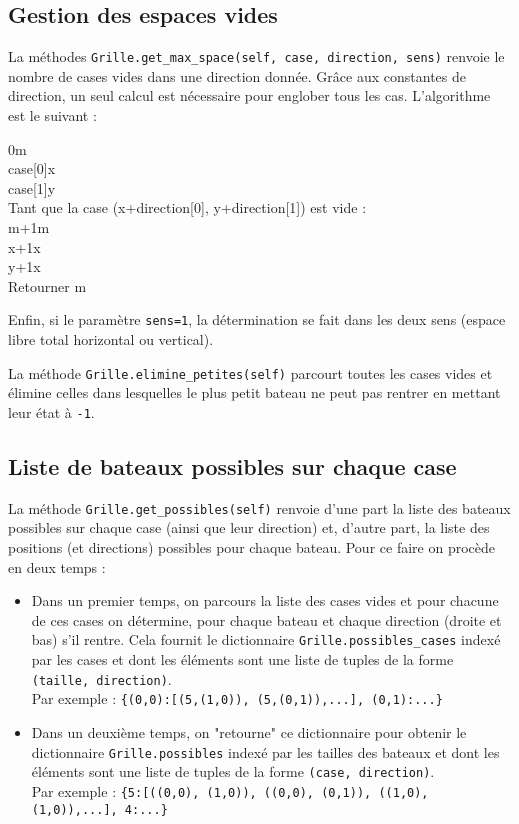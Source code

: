\subsection{Gestion des espaces vides}
La méthodes \texttt{Grille.get\_max\_space(self, case, direction, sens)} renvoie le nombre de cases vides dans une direction donnée. Grâce aux constantes de direction, un seul calcul est nécessaire pour englober tous les cas. L'algorithme est le suivant :
\begin{algo1}
0\sto m\\
case[0]\sto x\\
case[1]\sto y\\
Tant que la case (x+direction[0], y+direction[1]) est vide :\\
 m+1\sto m\\
 x+1\sto x\\
 y+1\sto x\\
Retourner m\\
\end{algo1}

Enfin, si le paramètre \texttt{sens=1}, la détermination se fait dans les deux sens (espace libre total horizontal ou vertical).

La méthode \texttt{Grille.elimine\_petites(self)} parcourt toutes les cases vides et élimine celles dans lesquelles le plus petit bateau ne peut pas rentrer en mettant leur état à \texttt{-1}.

\subsection{Liste de bateaux possibles sur chaque case}
La méthode \texttt{Grille.get\_possibles(self)} renvoie d'une part la liste des bateaux possibles sur chaque case (ainsi que leur direction) et, d'autre part, la liste des positions (et directions) possibles pour chaque bateau. Pour ce faire on procède en deux temps :
\begin{itemize}
\item Dans un premier temps, on parcours la liste des cases vides et pour chacune de ces cases on détermine, pour chaque bateau et chaque direction (droite et bas) s'il rentre. Cela fournit le dictionnaire \texttt{Grille.possibles\_cases} indexé par les cases et dont les éléments sont une liste de tuples de la forme \texttt{(taille, direction)}.\\
Par exemple : \texttt{\{(0,0):[(5,(1,0)), (5,(0,1)),...], (0,1):...\}}
\item Dans un deuxième temps, on "retourne" ce dictionnaire pour obtenir le dictionnaire \texttt{Grille.possibles} indexé par les tailles des bateaux et dont les éléments sont une liste de tuples de la forme \texttt{(case, direction)}.\\
Par exemple : \texttt{\{5:[((0,0), (1,0)), ((0,0), (0,1)), ((1,0), (1,0)),...], 4:...\}}
\end{itemize}


